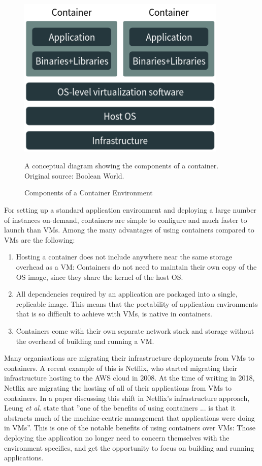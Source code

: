 \begin{figure}[ht]
      \centering
      \includegraphics[width=100mm, scale=0.6]{Images/Container_Illustration.png}
      \caption{Components of a Container Environment} 
      \medskip
	  \small
		A conceptual diagram showing the components of a container. Original source: Boolean World. \cite{ContainerAndVMImageSource}
      \label{ContainerConceptualDiagram}
\end{figure}


For setting up a standard application environment and deploying a large number of instances on-demand, containers are simple to configure and much faster to launch than VMs. Among the many advantages of using containers compared to VMs are the following: 
\begin{enumerate}
\item Hosting a container does not include anywhere near the same storage overhead as a VM: Containers do not need to maintain their own copy of the OS image, since they share the kernel of the host OS.
\item All dependencies required by an application are packaged into a single, replicable image. This means that the portability of application environments that is so difficult to achieve with VMs, is native in containers.
\item Containers come with their own separate network stack and storage without the overhead of building and running a VM. 
\end{enumerate}

Many organisations are migrating their infrastructure deployments from VMs to containers. A recent example of this is Netflix, who started migrating their infrastructure hosting to the AWS cloud in 2008. At the time of writing in 2018, Netflix are migrating the hosting of all of their applications from VMs to containers. In a paper discussing this shift in Netflix's infrastructure approach, \cite{NetflixContainerMigration} Leung \textit{et al.} state that ''one of the benefits of using containers ... is that it abstracts much of the machine-centric management that applications were doing in VMs''. This is one of the notable benefits of using containers over VMs: Those deploying the application no longer need to concern themselves with the environment specifics, and get the opportunity to focus on building and running applications.


